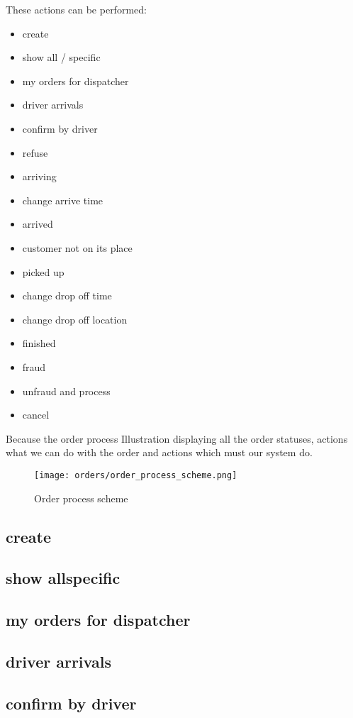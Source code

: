 		These actions can be performed:
		\begin{itemize}
			\item create
			\item show all / specific
			\item my orders for dispatcher
			\item driver arrivals
			\item confirm by driver
			\item refuse
			\item arriving
			\item change arrive time
			\item arrived
			\item customer not on its place
			\item picked up
			\item change drop off time
			\item change drop off location
			\item finished
			\item fraud
			\item unfraud and process
			\item cancel
		\end{itemize}
		
		
		
		Because the order process Illustration displaying all the order statuses, actions what we can do with the order and actions which must our system do.
		\begin{figure}[h]\centering
			\texttt{[image: orders/order\_process\_scheme.png]}
			\caption{Order process scheme}\label{order-process-scheme}
		\end{figure}
	
		\subsection{create}
		
		\subsection{show all\/specific}
		\subsection{my orders for dispatcher}
		\subsection{driver arrivals}
		\subsection{confirm by driver}
